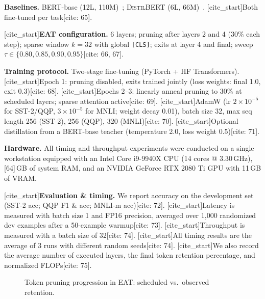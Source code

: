 \documentclass[11pt,letterpaper]{article}
\theoremstyle{plain}
\newcommand{\eat}{\textsc{EAT}}
\newcommand{\bert}{\textsc{BERT}}
\newcommand{\distilbert}{\textsc{DistilBERT}}
\newcommand{\cls}{\texttt{[CLS]}}
\begin{document}
\textbf{Baselines.} \bert{}-base (12L, 110M)~\citep{devlin2019bert}; \distilbert{} (6L, 66M)~\citep{sanh2019distilbert}. [cite_start]Both fine-tuned per task[cite: 65].

[cite_start]\textbf{\eat{} configuration.} 6 layers; pruning after layers 2 and 4 (30\% each step); sparse window $k{=}32$ with global \cls{}; exits at layer 4 and final; sweep $\tau\in\{0.80,0.85,0.90,0.95\}$[cite: 66, 67].

\textbf{Training protocol.} Two-stage fine-tuning (PyTorch + HF Transformers). [cite_start]Epoch 1: pruning disabled, exits trained jointly (loss weights: final 1.0, exit 0.3)[cite: 68]. [cite_start]Epochs 2--3: linearly anneal pruning to 30\% at scheduled layers; sparse attention active[cite: 69]. [cite_start]AdamW (lr $2\!\times\!10^{-5}$ for SST-2/QQP, $3\!\times\!10^{-5}$ for MNLI; weight decay 0.01), batch size 32, max seq length 256 (SST-2), 256 (QQP), 320 (MNLI)[cite: 70]. [cite_start]Optional distillation from a \bert{}-base teacher (temperature 2.0, loss weight 0.5)[cite: 71].

\textbf{Hardware.} All timing and throughput experiments were conducted on a single workstation equipped with an Intel Core i9-9940X CPU (14 cores @ 3.30\,GHz), [64]\,GB of system RAM, and an NVIDIA GeForce RTX 2080 Ti GPU with 11\,GB of VRAM.

[cite_start]\textbf{Evaluation \& timing.} We report accuracy on the development set (SST-2 acc; QQP F1 \& acc; MNLI-m acc)[cite: 72]. [cite_start]Latency is measured with batch size 1 and FP16 precision, averaged over 1{,}000 randomized dev examples after a 50-example warmup[cite: 73]. [cite_start]Throughput is measured with a batch size of 32[cite: 74]. [cite_start]All timing results are the average of 3 runs with different random seeds[cite: 74]. [cite_start]We also record the average number of executed layers, the final token retention percentage, and normalized FLOPs[cite: 75].

\begin{figure}[t]
\centering
{}
\caption{Token pruning progression in \eat{}: scheduled vs.\ observed retention.}
\label{fig:pruning}
\end{figure}
\end{document}

